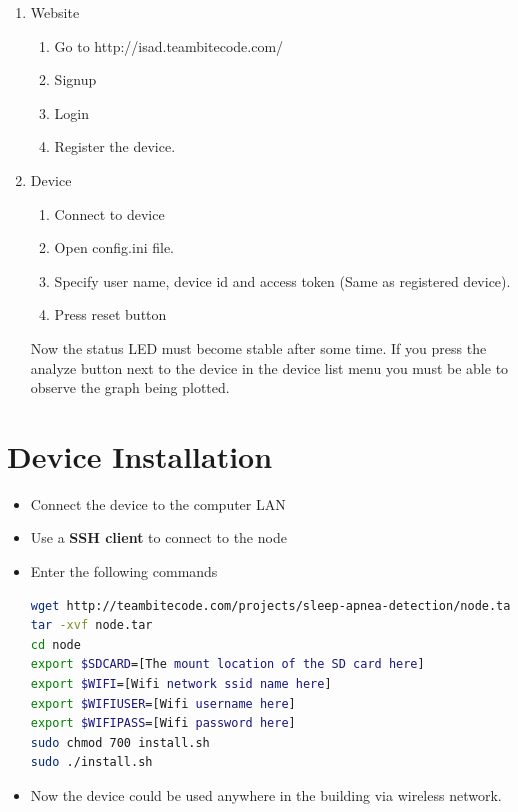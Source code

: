 \documentclass{article}
\begin{document}
\begin{enumerate}

  \item Website 
    \begin{enumerate}
      \item Go to http://isad.teambitecode.com/
      \item Signup
      \item Login
      \item Register the device.
    \end{enumerate}

  \item Device
    \begin{enumerate}
      \item Connect to device
      \item Open config.ini file.
      \item Specify user name, device id and access token (Same as registered device).
      \item Press reset button
    \end{enumerate}
    
Now the status LED must become stable after some time. If you press the analyze button next to the device in the device list menu you must be able to observe the graph being plotted.
  
\end{enumerate}


\section{Device Installation}
\begin{itemize}
    \item Connect the device to the computer LAN
    \item Use a \textbf{SSH client} to connect to the node
    \item Enter the following commands\\
\begin{lstlisting}[language=bash]
wget http://teambitecode.com/projects/sleep-apnea-detection/node.tar
tar -xvf node.tar
cd node
export $SDCARD=[The mount location of the SD card here]
export $WIFI=[Wifi network ssid name here]
export $WIFIUSER=[Wifi username here]
export $WIFIPASS=[Wifi password here]
sudo chmod 700 install.sh
sudo ./install.sh
\end{lstlisting}
    \item Now the device could be used anywhere in the building via wireless network.
\end{itemize}
\end{document}
